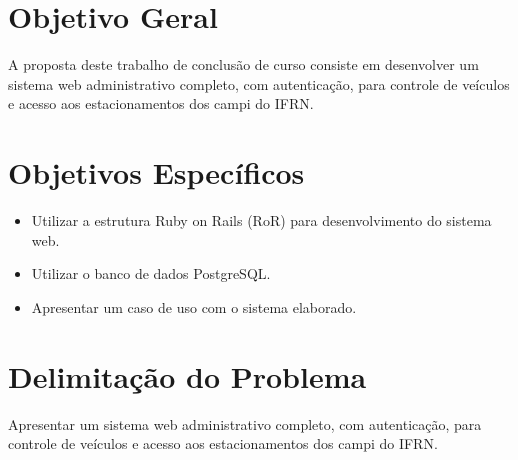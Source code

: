  \section{Objetivo Geral}\label{sec:objetivos}
 A proposta deste trabalho de conclusão de curso consiste em desenvolver um sistema web administrativo completo, com autenticação, para controle de veículos e acesso aos estacionamentos dos campi do IFRN.
 \section{Objetivos Específicos}
 \begin{itemize}
 	\item Utilizar a estrutura Ruby on Rails (RoR) \cite{hartl2011ruby} para desenvolvimento do sistema web.
 	\item Utilizar o banco de dados  PostgreSQL.
 	\item Apresentar um caso de uso com o sistema elaborado.
 \end{itemize}
 
 \section{Delimitação do Problema} 
Apresentar um sistema web administrativo completo, com autenticação, para controle de veículos e acesso aos estacionamentos dos campi do IFRN.
